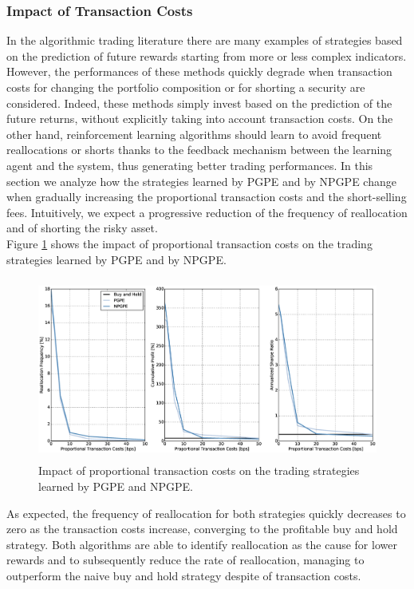 \subsubsection{Impact of Transaction Costs}
In the algorithmic trading literature there are many examples of strategies based on the prediction of future rewards starting from more or less complex indicators. However, the performances of these methods quickly degrade when transaction costs for changing the portfolio composition or for shorting a security are considered. Indeed, these methods simply invest based on the prediction of the future returns, without explicitly taking into account transaction costs. On the other hand, reinforcement learning algorithms should learn to avoid frequent reallocations or shorts thanks to the feedback mechanism between the learning agent and the system, thus generating better trading performances. In this section we analyze how the strategies learned by \gls{PGPE} and by \gls{NPGPE} change when gradually increasing the proportional transaction costs and the short-selling fees. Intuitively, we expect a progressive reduction of the frequency of reallocation and of shorting the risky asset.\\
Figure \ref{fig:impact_transaction_costs} shows the impact of proportional transaction costs on the trading strategies learned by \gls{PGPE} and by \gls{NPGPE}. 
\begin{figure}[t!]
	\centering
	\includegraphics[height=6cm,width=1.0\textwidth]{Images/6_2_impact_transaction_costs}
	\caption[Proportional transaction costs and risk-neutral strategies.]{Impact of proportional transaction costs on the trading strategies learned by PGPE and NPGPE.}
	\label{fig:impact_transaction_costs}
\end{figure}
As expected, the frequency of reallocation for both strategies quickly decreases to zero as the transaction costs increase, converging to the profitable buy and hold strategy. Both algorithms are able to identify reallocation as the cause for lower rewards and to subsequently reduce the rate of reallocation, managing to outperform the naive buy and hold strategy despite of transaction costs.\\
